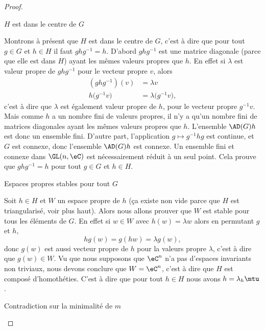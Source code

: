 \begin{proof}
\begin{subproof}
\item[\( H\) est dans le centre de \( G\)]

    Montrons à présent que \( H\) est dans le centre de \( G\), c'est à dire que pour tout \( g\in G\) et \( h\in H\) il faut \( ghg^{-1}=h\). D'abord \( ghg^{-1}\) est une matrice diagonale (parce que elle est dans \( H\)) ayant les mêmes valeurs propres que \( h\). En effet si \( \lambda\) est valeur propre de \( ghg^{-1}\) pour le vecteur propre \( v\), alors
    \begin{subequations}
        \begin{align}
            (ghg^{-1})(v)&=\lambda v\\
            h\big( g^{-1} v \big)&=\lambda \big( g^{-1}v \big),
        \end{align}
    \end{subequations}
    c'est à dire que \( \lambda\) est également valeur propre de \( h\), pour le vecteur propre \( g^{-1} v\). Mais comme \( h\) a un nombre fini de valeurs propres, il n'y a qu'un nombre fini de matrices diagonales ayant les mêmes valeurs propres que \( h\). L'ensemble \( \AD(G)h\) est donc un ensemble fini. D'autre part, l'application \( g\mapsto g^{-1}hg\) est continue, et \( G\) est connexe, donc l'ensemble \( \AD(G)h\) est connexe. Un ensemble fini et connexe dans \( \GL(n,\eC)\) est nécessairement réduit à un seul point. Cela prouve que \( ghg^{-1}=h\) pour tout \( g\in G\) et \( h\in H\).

\item[Espaces propres stables pour tout \( G\)]

        Soit \( h\in H\) et \( W\) un espace propre de \( h\) (ça existe non vide parce que \( H\) est triangularisé, voir plus haut). Alors nous allons prouver que \( W\) est stable pour tous les éléments de \( G\). En effet si \( w\in W\) avec \( h(w)=\lambda w\) alors en permutant \( g\) et \( h\),
        \begin{equation}
            hg(w)=g(hw)=\lambda g(w),
        \end{equation}
        donc \( g(w)\) est aussi vecteur propre de \( h\) pour la valeurs propre \( \lambda\), c'est à dire que \( g(w)\in W\). Vu que nous supposons que \( \eC^n\) n'a pas d'espaces invariants non triviaux, nous devons conclure que \( W=\eC^n\), c'est à dire que \( H\) est composé d'homothéties. C'est à dire que pour tout \( h\in H\) nous avons \( h=\lambda_h\mtu\).

    \item[Contradiction sur la minimalité de \( m\)]


\end{subproof}
\end{proof}
